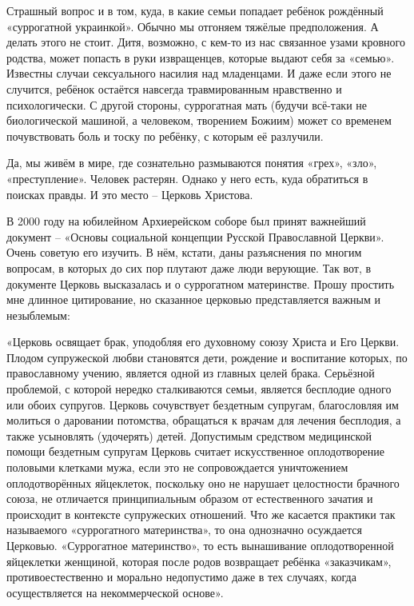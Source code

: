 Страшный вопрос и в том, куда, в какие семьи попадает ребёнок рождённый
«суррогатной украинкой». Обычно мы отгоняем тяжёлые предположения. А делать
этого не стоит. Дитя, возможно, с кем-то из нас связанное узами кровного
родства, может попасть в руки извращенцев, которые выдают себя за «семью».
Известны случаи сексуального насилия над младенцами. И даже если этого не
случится, ребёнок остаётся навсегда травмированным нравственно и
психологически. С другой стороны, суррогатная мать (будучи всё-таки не
биологической машиной, а человеком, творением Божиим) может со временем
почувствовать боль и тоску по ребёнку, с которым её разлучили.

Да, мы живём в мире, где сознательно размываются понятия «грех», «зло»,
«преступление». Человек растерян. Однако у него есть, куда обратиться в поисках
правды. И это место –  Церковь Христова.

В 2000 году на юбилейном Архиерейском соборе был принят важнейший документ –
«Основы социальной концепции Русской Православной Церкви». Очень советую его
изучить. В нём, кстати, даны разъяснения по многим вопросам, в которых до сих
пор плутают даже люди верующие. Так вот, в документе Церковь высказалась и о
суррогатном материнстве. Прошу простить мне длинное цитирование, но сказанное
церковью представляется важным и незыблемым:

\begin{zzquote}
«Церковь освящает брак, уподобляя его духовному союзу Христа и Его Церкви.
Плодом супружеской любви становятся дети, рождение и воспитание которых, по
православному учению, является одной из главных целей брака. Серьёзной
проблемой, с которой нередко сталкиваются семьи, является бесплодие одного или
обоих супругов. Церковь сочувствует бездетным супругам, благословляя им
молиться о даровании потомства, обращаться к врачам для лечения бесплодия, а
также усыновлять (удочерять) детей. Допустимым средством медицинской помощи
бездетным супругам Церковь считает искусственное оплодотворение половыми
клетками мужа, если это не сопровождается уничтожением оплодотворённых
яйцеклеток, поскольку оно не нарушает целостности брачного союза, не отличается
принципиальным образом от естественного зачатия и происходит в контексте
супружеских отношений. Что же касается практики так называемого «суррогатного
материнства», то она однозначно осуждается Церковью. «Суррогатное материнство»,
то есть вынашивание оплодотворенной яйцеклетки женщиной, которая после родов
возвращает ребёнка «заказчикам», противоестественно и морально недопустимо даже
в тех случаях, когда осуществляется на некоммерческой основе».	
\end{zzquote}

